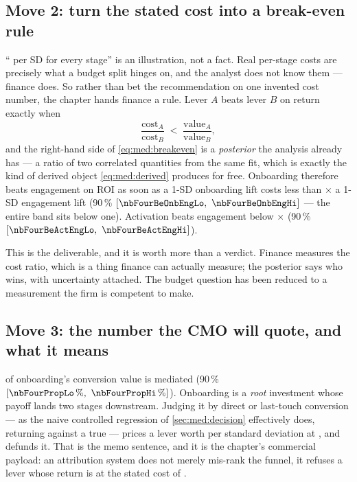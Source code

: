 \subsection*{Move 2: turn the stated cost into a break-even rule}

``\eur{\nbFourCostSd} per SD for every stage'' is an illustration, not a fact. Real per-stage costs
are precisely what a budget split hinges on, and the analyst does not know them --- finance does. So
rather than bet the recommendation on one invented cost number, the chapter hands finance a rule.
Lever $A$ beats lever $B$ on return exactly when
%
\begin{equation}
  \frac{\text{cost}_A}{\text{cost}_B} \;<\; \frac{\text{value}_A}{\text{value}_B},
  \label{eq:med:breakeven}
\end{equation}
%
and the right-hand side of \cref{eq:med:breakeven} is a \emph{posterior} the analysis already has ---
a ratio of two correlated quantities from the same fit, which is exactly the kind of derived object
\cref{eq:med:derived} produces for free. Onboarding therefore beats engagement on ROI as soon as a
1-SD onboarding lift costs less than \nbFourBeOnbEng$\times$ a 1-SD engagement lift (90\,\%
$[\nbFourBeOnbEngLo,\ \nbFourBeOnbEngHi]$ --- the entire band sits below one). Activation beats
engagement below \nbFourBeActEng$\times$ (90\,\% $[\nbFourBeActEngLo,\ \nbFourBeActEngHi]$).

This is the deliverable, and it is worth more than a verdict. Finance measures the cost ratio, which
is a thing finance can actually measure; the posterior says who wins, with uncertainty attached. The
budget question has been reduced to a measurement the firm is competent to make.

\subsection*{Move 3: the number the CMO will quote, and what it means}

\pc{\nbFourPropMediated} of onboarding's conversion value is mediated
(90\,\% $[\pc{\nbFourPropLo},\ \pc{\nbFourPropHi}]$). Onboarding is a \emph{root} investment whose
payoff lands two stages downstream. Judging it by direct or last-touch conversion --- as the naive
controlled regression of \cref{sec:med:decision} effectively does, returning \nbFourNaiveOnCoef{}
against a true \nbFourTrueTotal{} --- prices a lever worth \eur{\nbFourValOnboarding} per standard
deviation at \eur{\nbFourValOnboardingNaive}, and defunds it. That is the memo sentence, and it is
the chapter's commercial payload: an attribution system does not merely mis-rank the funnel, it
refuses a lever whose return is \nbFourRoiOnboarding{} at the stated cost of \eur{\nbFourCostSd}.

